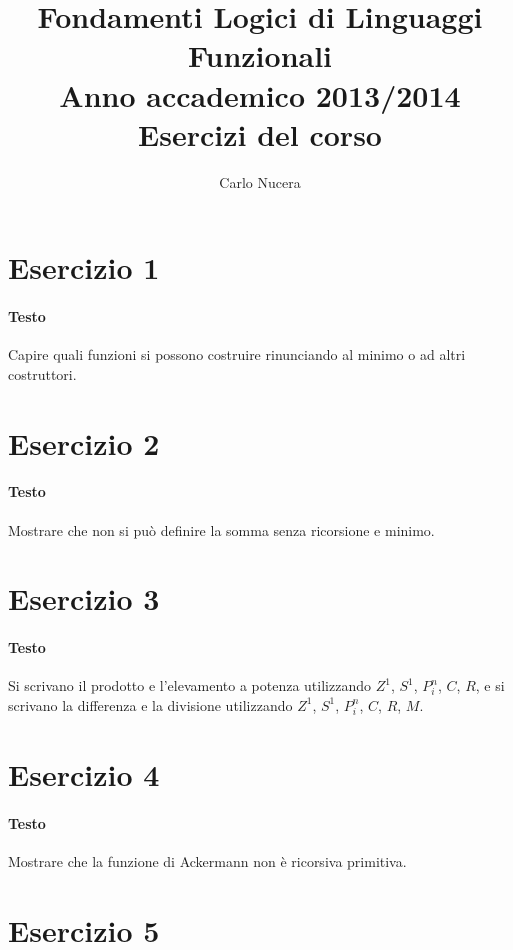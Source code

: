 \documentclass[a4paper,11pt]{article}
\begin{document}
\title{Fondamenti Logici di Linguaggi Funzionali \\ \small{Anno accademico 2013/2014 \\ Esercizi del corso}}
\author{Carlo Nucera}

\maketitle

\section*{Esercizio 1}
\paragraph{Testo}
Capire quali funzioni si possono costruire rinunciando al minimo o ad altri costruttori.

\section*{Esercizio 2}
\paragraph{Testo}
Mostrare che non si può definire la somma senza ricorsione e minimo.

\section*{Esercizio 3}
\paragraph{Testo}
Si scrivano il prodotto e l’elevamento a potenza utilizzando $Z^1$, $S^1$, $P^n_i$, $C$, $R$, e si scrivano la differenza e la divisione utilizzando $Z^1$, $S^1$, $P^n_i$, $C$, $R$, $M$.

\section*{Esercizio 4}
\paragraph{Testo}
Mostrare che la funzione di Ackermann non è ricorsiva primitiva.

\section*{Esercizio 5}
\end{document}
